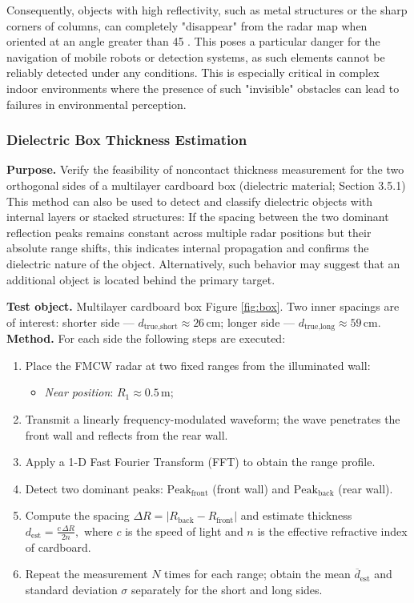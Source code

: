Consequently, objects with high reflectivity, such as metal structures or the sharp corners of columns, can completely "disappear" from the radar map when oriented at an angle greater than 45 \degree. This poses a particular danger for the navigation of mobile robots or detection systems, as such elements cannot be reliably detected under any conditions. This is especially critical in complex indoor environments where the presence of such "invisible" obstacles can lead to failures in environmental perception.

\subsubsection{Dielectric Box Thickness Estimation}\label{sec:box-thickness}

\textbf{Purpose.} Verify the feasibility of noncontact thickness measurement for the two orthogonal sides of a multilayer cardboard box (dielectric material; Section 3.5.1)  
This method can also be used to detect and classify dielectric objects with internal layers or stacked structures: If the spacing between the two dominant reflection peaks remains constant across multiple radar positions but their absolute range shifts, this indicates internal propagation and confirms the dielectric nature of the object. Alternatively, such behavior may suggest that an additional object is located behind the primary target.

\textbf{Test object.} Multilayer cardboard box Figure \ref{fig:box}.  
Two inner spacings are of interest:  
shorter side — \(d_{\text{true,short}} \approx 26\,\text{cm}\);  
longer side — \(d_{\text{true,long}}  \approx 59\,\text{cm}\).
\textbf{Method.}  
For each side the following steps are executed:
\begin{enumerate}
    \item Place the FMCW radar at two fixed ranges from the illuminated wall:
          \begin{itemize}
              \item \emph{Near position}: \(R_{1} \approx 0.5\,\text{m}\);
          \end{itemize}
    \item Transmit a linearly frequency-modulated waveform; the wave penetrates the front wall and reflects from the rear wall.
    \item Apply a 1-D Fast Fourier Transform (FFT) to obtain the range profile.
    \item Detect two dominant peaks: \(\mathrm{Peak}_{\text{front}}\) (front wall) and \(\mathrm{Peak}_{\text{back}}\) (rear wall).
    \item Compute the spacing \(\Delta R = \lvert R_{\text{back}} - R_{\text{front}}\rvert\) and estimate thickness
          $
              d_{\text{est}} = \frac{c\,\Delta R}{2n},
          $
          where \(c\) is the speed of light and \(n\) is the effective refractive index of cardboard.
    \item Repeat the measurement \(N\) times for each range; obtain the mean \(\overline{d}_{\text{est}}\) and standard deviation \(\sigma\) separately for the short and long sides.
\end{enumerate}

